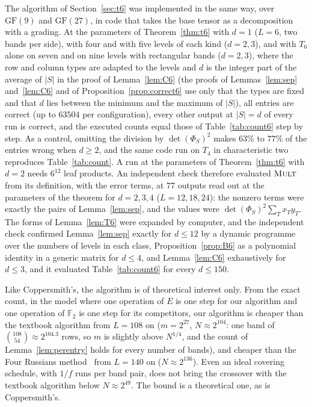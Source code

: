 \documentclass[11pt]{article}
\theoremstyle{definition}
\theoremstyle{remark}
\newcommand{\F}{\mathbb{F}}
\newcommand{\GF}{\mathrm{GF}}
\newcommand{\Mult}{\textnormal{\textsc{Mult}}}
\begin{document}
The algorithm of Section~\ref{sec:t6} was implemented in the same way, over $\GF(9)$ and $\GF(27)$, in code that takes the base tensor as a decomposition with a grading. At the parameters of Theorem~\ref{thm:t6} with $d=1$ ($L=6$, two bands per side), with four and with five levels of each kind ($d=2,3$), and with $T_6$ alone on seven and on nine levels with rectangular bands ($d=2,3$), where the row and column types are adapted to the levels and $d$ is the integer part of the average of $|S|$ in the proof of Lemma~\ref{lem:C6} (the proofs of Lemmas~\ref{lem:sep} and~\ref{lem:C6} and of Proposition~\ref{prop:correct6} use only that the types are fixed and that $d$ lies between the minimum and the maximum of $|S|$), all entries are correct (up to $63504$ per configuration), every other output at $|S|=d$ of every run is correct, and the executed counts equal those of Table~\ref{tab:count6} step by step. As a control, omitting the division by $\det(\Phi_S)^2$ makes $63\%$ to $77\%$ of the entries wrong when $d\ge2$, and the same code run on $T_4$ in characteristic two reproduces Table~\ref{tab:count}. A run at the parameters of Theorem~\ref{thm:t6} with $d=2$ needs $6^{12}$ leaf products. An independent check therefore evaluated $\Mult$ from its definition, with the error terms, at $77$ outputs read out at the parameters of the theorem for $d=2,3,4$ ($L=12,18,24$): the nonzero terms were exactly the pairs of Lemma~\ref{lem:sep}, and the values were $\det(\Phi_S)^2\sum_Tx_Ty_T$. The forms of Lemma~\ref{lem:T6} were expanded by computer, and the independent check confirmed Lemma~\ref{lem:sep} exactly for $d\le12$ by a dynamic programme over the numbers of levels in each class, Proposition~\ref{prop:B6} as a polynomial identity in a generic matrix for $d\le4$, and Lemma~\ref{lem:C6} exhaustively for $d\le3$, and it evaluated Table~\ref{tab:count6} for every $d\le150$.

Like Coppersmith's, the algorithm is of theoretical interest only. From the exact count, in the model where one operation of $E$ is one step for our algorithm and one operation of $\F_2$ is one step for its competitors, our algorithm is cheaper than the textbook algorithm from $L=108$ on ($m=2^{27}$, $N\approx2^{104}$: one band of $\binom{108}{54}\approx2^{104.3}$ rows, so $m$ is slightly above $N^{1/4}$, and the count of Lemma~\ref{lem:perentry} holds for every number of bands), and cheaper than the Four Russians method~\cite{ADKF70} from $L=140$ on ($N\approx2^{136}$). Even an ideal covering schedule, with $1/f$ runs per band pair, does not bring the crossover with the textbook algorithm below $N\approx2^{49}$. The bound is a theoretical one, as is Coppersmith's.
\end{document}
